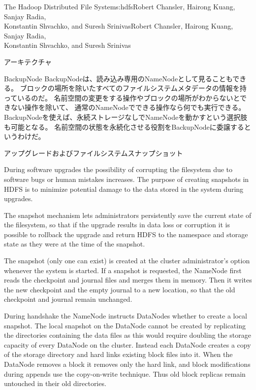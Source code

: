 \begin{aosachaptertoc}{The Hadoop Distributed File System}{s:hdfs}{Robert Chansler, Hairong Kuang, Sanjay Radia, \\ Konstantin Shvachko, and Suresh Srinivas}{Robert Chansler, Hairong Kuang, Sanjay Radia, \\ \hspace*{0.9cm} Konstantin Shvachko, and Suresh Srinivas}
\begin{aosasect1}{アーキテクチャ}
\begin{aosasect2}{BackupNode}
BackupNodeは、読み込み専用のNameNodeとして見ることもできる。
ブロックの場所を除いたすべてのファイルシステムメタデータの情報を持っているのだ。
名前空間の変更をする操作やブロックの場所がわからないとできない操作を除いて、
通常のNameNodeでできる操作なら何でも実行できる。
BackupNodeを使えば、永続ストレージなしでNameNodeを動かすという選択肢も可能となる。
名前空間の状態を永続化させる役割をBackupNodeに委譲するというわけだ。

\end{aosasect2}

\begin{aosasect2}{アップグレードおよびファイルシステムスナップショット}

During software upgrades the possibility of corrupting the filesystem
due to software bugs or human mistakes increases. The purpose of
creating snapshots in HDFS is to minimize potential damage to the data
stored in the system during upgrades.

The snapshot mechanism lets administrators persistently save the
current state of the filesystem, so that if the upgrade results in
data loss or corruption it is possible to rollback the upgrade and
return HDFS to the namespace and storage state as they were at the
time of the snapshot.

The snapshot (only one can exist) is created at the cluster
administrator's option whenever the system is started. If a snapshot
is requested, the NameNode first reads the checkpoint and journal
files and merges them in memory. Then it writes the new checkpoint and
the empty journal to a new location, so that the old checkpoint and
journal remain unchanged.

During handshake the NameNode instructs DataNodes whether to create a
local snapshot. The local snapshot on the DataNode cannot be created
by replicating the directories containing the data files as this would require
doubling the storage capacity of every DataNode on the
cluster. Instead each DataNode creates a copy of the storage directory
and hard links existing block files into it. When the DataNode removes
a block it removes only the hard link, and block modifications during
appends use the copy-on-write technique.  Thus old block replicas
remain untouched in their old directories.


\end{aosasect2}
\end{aosasect1}
\end{aosachaptertoc}
